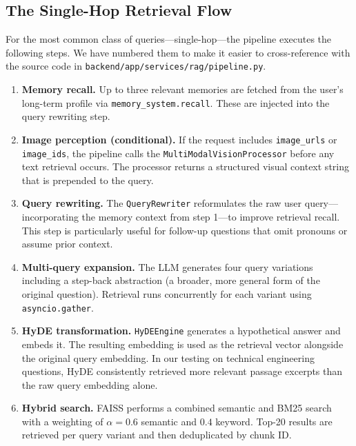 \subsection{The Single-Hop Retrieval Flow}

For the most common class of queries---single-hop---the pipeline executes the
following steps. We have numbered them to make it easier to cross-reference with
the source code in \texttt{backend/app/services/rag/pipeline.py}.

\begin{enumerate}
    \item \textbf{Memory recall.} Up to three relevant memories are fetched from
    the user's long-term profile via \texttt{memory\_system.recall}. These are
    injected into the query rewriting step.

    \item \textbf{Image perception (conditional).} If the request includes
    \texttt{image\_urls} or \texttt{image\_ids}, the pipeline calls the
    \texttt{MultiModalVisionProcessor} before any text retrieval occurs. The
    processor returns a structured visual context string that is prepended to
    the query.

    \item \textbf{Query rewriting.} The \texttt{QueryRewriter} reformulates
    the raw user query---incorporating the memory context from step 1---to
    improve retrieval recall. This step is particularly useful for follow-up
    questions that omit pronouns or assume prior context.

    \item \textbf{Multi-query expansion.} The LLM generates four query
    variations including a step-back abstraction (a broader, more general form
    of the original question). Retrieval runs concurrently for each variant
    using \texttt{asyncio.gather}.

    \item \textbf{HyDE transformation.} \texttt{HyDEEngine} generates a
    hypothetical answer and embeds it. The resulting embedding is used as the
    retrieval vector alongside the original query embedding. In our testing on
    technical engineering questions, HyDE consistently retrieved more relevant
    passage excerpts than the raw query embedding alone.

    \item \textbf{Hybrid search.} FAISS performs a combined semantic and BM25
    search with a weighting of $\alpha=0.6$ semantic and $0.4$ keyword. Top-20
    results are retrieved per query variant and then deduplicated by chunk ID.


\end{enumerate}
